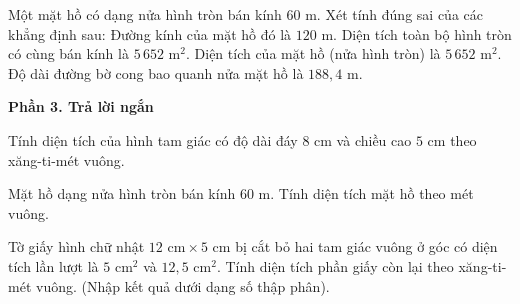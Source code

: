 \begin{ex} %
Một mặt hồ có dạng nửa hình tròn bán kính $60\text{ m}$. Xét tính đúng sai của các khẳng định sau:
\choiceTF
{\True Đường kính của mặt hồ đó là $120\text{ m}$.}
{Diện tích toàn bộ hình tròn có cùng bán kính là $5\,652\text{ m}^2$.}
{\True Diện tích của mặt hồ (nửa hình tròn) là $5\,652\text{ m}^2$.}
{\True Độ dài đường bờ cong bao quanh nửa mặt hồ là $188{,}4\text{ m}$.}
\end{ex}

\textbf{Phần 3. Trả lời ngắn}

\begin{ex} %
Tính diện tích của hình tam giác có độ dài đáy $8\text{ cm}$ và chiều cao $5\text{ cm}$ theo xăng-ti-mét vuông.
\end{ex}

\begin{ex} %
Mặt hồ dạng nửa hình tròn bán kính $60\text{ m}$. Tính diện tích mặt hồ theo mét vuông.
\end{ex}

\begin{ex} %
Tờ giấy hình chữ nhật $12\text{ cm} \times 5\text{ cm}$ bị cắt bỏ hai tam giác vuông ở góc có diện tích lần lượt là $5\text{ cm}^2$ và $12{,}5\text{ cm}^2$. Tính diện tích phần giấy còn lại theo xăng-ti-mét vuông. (Nhập kết quả dưới dạng số thập phân).
\end{ex}

